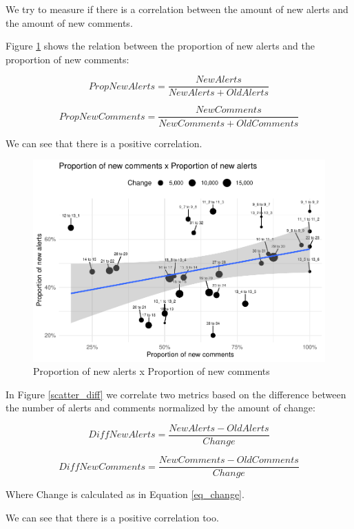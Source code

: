 \documentclass[
]{article}
\begin{document}
We try to measure if there is a correlation between the amount of new
alerts and the amount of new comments.

Figure \ref{scatter_prop} shows the relation between the proportion of
new alerts and the proportion of new comments:

\[PropNewAlerts = \frac{NewAlerts}{NewAlerts + OldAlerts}\]

\[PropNewComments = \frac{NewComments}{NewComments + OldComments}\]

We can see that there is a positive correlation.

\small

\begin{figure}
\centering
\includegraphics{report_files/figure-latex/unnamed-chunk-27-1.pdf}
\caption{\label{scatter_prop}Proportion of new alerts x Proportion of
new comments}
\end{figure}

\normalsize

In Figure \ref{scatter_diff} we correlate two metrics based on the
difference between the number of alerts and comments normalized by the
amount of change:

\[DiffNewAlerts = \frac{NewAlerts - OldAlerts}{Change}\]

\[DiffNewComments = \frac{NewComments - OldComments}{Change}\]

Where Change is calculated as in Equation \ref{eq_change}.

We can see that there is a positive correlation too.

\small
\end{document}
